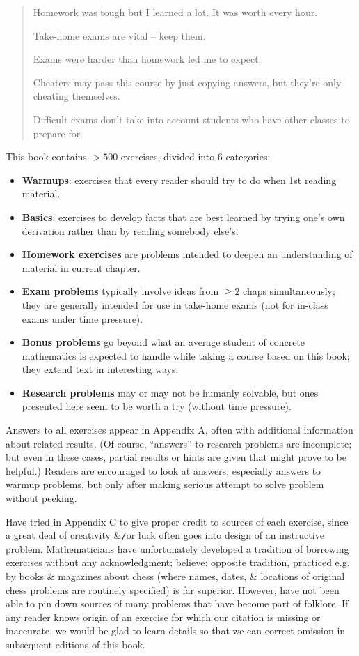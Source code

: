 \documentclass{article}
\begin{document}
\begin{enumerate}
\begin{quote}
		Homework was tough but I learned a lot. It was worth every hour.
		
		Take-home exams are vital -- keep them.
		
		Exams were harder than homework led me to expect.
		
		Cheaters may pass this course by just copying answers, but they're only cheating themselves.
		
		Difficult exams don't take into account students who have other classes to prepare for.
	\end{quote}
	This book contains $> 500$ exercises, divided into 6 categories:
	\begin{itemize}
		\item {\bf Warmups}: exercises that every reader should try to do when 1st reading material.
		\item {\bf Basics}: exercises to develop facts that are best learned by trying one's own derivation rather than by reading somebody else's.
		\item {\bf Homework exercises} are problems intended to deepen an understanding of material in current chapter.
		\item {\bf Exam problems} typically involve ideas from $\ge2$ chaps simultaneously; they are generally intended for use in take-home exams (not for in-class exams under time pressure).
		\item {\bf Bonus problems} go beyond what an average student of concrete mathematics is expected to handle while taking a course based on this book; they extend text in interesting ways.
		\item {\bf Research problems} may or may not be humanly solvable, but ones presented here seem to be worth a try (without time pressure).
	\end{itemize}
	Answers to all exercises appear in Appendix A, often with additional information about related results. (Of course, ``answers'' to research problems are incomplete; but even in these cases, partial results or hints are given that might prove to be helpful.) Readers are encouraged to look at answers, especially answers to warmup problems, but only after making serious attempt to solve problem without peeking.
	
	Have tried in Appendix C to give proper credit to sources of each exercise, since a great deal of creativity \&{\tt/}or luck often goes into design of an instructive problem. Mathematicians have unfortunately developed a tradition of borrowing exercises without any acknowledgment; believe: opposite tradition, practiced e.g. by books \& magazines about chess (where names, dates, \& locations of original chess problems are routinely specified) is far superior. However, have not been able to pin down sources of many problems that have become part of folklore. If any reader knows origin of an exercise for which our citation is missing or inaccurate, we would be glad to learn details so that we can correct omission in subsequent editions of this book.
	

\end{enumerate}
\end{document}
